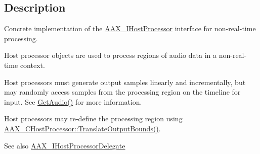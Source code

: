 \subsection{Description}
Concrete implementation of the \mbox{\hyperlink{a01833}{A\+A\+X\+\_\+\+I\+Host\+Processor}} interface for non-\/real-\/time processing. 

Host processor objects are used to process regions of audio data in a non-\/real-\/time context.
\begin{DoxyItemize}
\item Host processors must generate output samples linearly and incrementally, but may randomly access samples from the processing region on the timeline for input. See \mbox{\hyperlink{a01837_ae083d877253163dd367f46c7c491e9e3}{Get\+Audio()}} for more information.
\item Host processors may re-\/define the processing region using \mbox{\hyperlink{a01485_a4d793e60071069e6f98c4d841d37ac96}{A\+A\+X\+\_\+\+C\+Host\+Processor\+::\+Translate\+Output\+Bounds()}}.
\end{DoxyItemize}

\begin{DoxySeeAlso}{See also}
\mbox{\hyperlink{a01837}{A\+A\+X\+\_\+\+I\+Host\+Processor\+Delegate}} 
\end{DoxySeeAlso}
